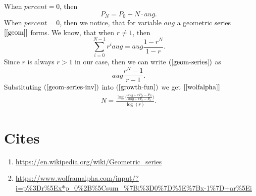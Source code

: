 \documentclass[12pt]{article}
\begin{document}
\hspace{-0.5}When $percent = 0$, then
\begin{equation*}
    P_N = P_0+N\cdot aug.
\end{equation*}
When $percent = 0$, then we notice, that for variable $aug$ a geometric series $[\ref{geom}]$ forms.
We know, that when $r\ne 1$, then 
\begin{equation}
    \sum_{i=0}^{N-1}r^{i}aug = aug\frac{1-r^{N}}{1-r}. \label{geom-series}
\end{equation}
Since $r$ is always $r>1$ in our case, then we can write $(\ref{geom-series})$ as 
\begin{equation}
    aug\frac{r^{N}-1}{r-1}. \label{geom-series-inv}
\end{equation}
Substituting $(\ref{geom-series-inv})$ into $(\ref{growth-fun})$ we get $[\ref{wolfalpha}]$
\begin{align*}
    N = \frac{\log\big(\frac{aug+rP_N-P_N}{aug+rP_0-P_0}\big)}{\log(r)}.
\end{align*}

\section*{Cites}
\begin{enumerate}
    \item \url{https://en.wikipedia.org/wiki/Geometric_series} \label{geom}
    \item \url{https://www.wolframalpha.com/input/?i=p\%3Dr\%5Ex*p_0\%2B\%5Csum_\%7Bi\%3D0\%7D\%5E\%7Bx-1\%7D+ar\%5Ei} \label{wolfalpha}
\end{enumerate}
\end{document}
